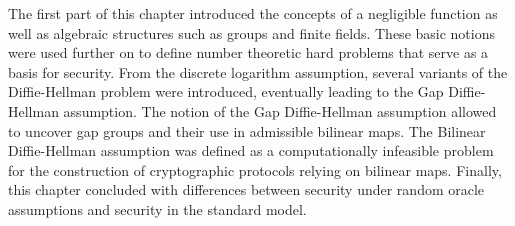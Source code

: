 The first part of this chapter introduced the concepts of a negligible function as well as algebraic structures such as groups and finite fields. These basic notions were used further on to define number theoretic hard problems that serve as a basis for security. From the discrete logarithm assumption, several variants of the Diffie-Hellman problem were introduced, eventually leading to the Gap Diffie-Hellman assumption. The notion of the Gap Diffie-Hellman assumption allowed to uncover gap groups and their use in admissible bilinear maps. The Bilinear Diffie-Hellman assumption was defined as a computationally infeasible problem for the construction of cryptographic protocols relying on bilinear maps. Finally, this chapter concluded with differences between security under random oracle assumptions and security in the standard model. 

